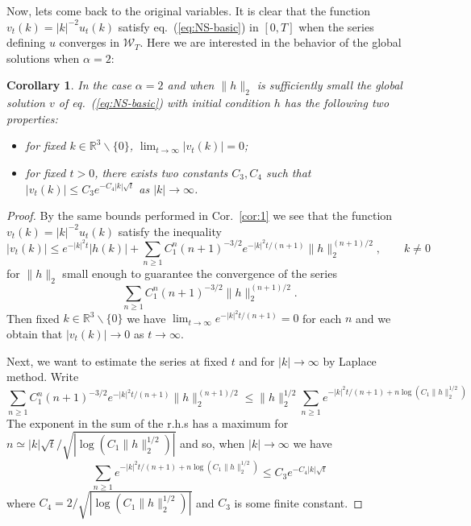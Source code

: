 \documentclass[a4paper,12pt,reqno]{amsart}
\newcommand{\1}{{\bf 1}}
\newcommand{\RR}{\mathbb{R}}
\newtheorem{corollary}[theorem]{Corollary}
\newcommand{\WW}{\mathcal{W}}
\begin{document}
Now, lets come back to the original variables. It is clear that the function $v_t(k) = |k|^{-2} u_t(k)$ satisfy eq.~(\ref{eq:NS-basic}) in $[0,T]$ when the series defining $u$ converges in $\WW_T$.  Here we are interested in the behavior of the global solutions when $\alpha =2$:

\begin{corollary}
In the case $\alpha = 2$ and when $\|h\|_2$ is sufficiently small the
global solution $v$ of  eq.~(\ref{eq:NS-basic}) with initial condition
$h$ has the following two properties:
\begin{itemize}
\item[a)]  for fixed $k \in \RR^3\backslash \{0\}$, $
\lim_{t \to \infty } |v_t(k)| = 0  $;
\item[b)] for fixed $t > 0$, there exists two constants $C_3,C_4$ such that
 $|v_t(k)| \le C_3 e^{-C_4 |k|\sqrt{t}}$ as $|k| \to \infty$.
\end{itemize}
\end{corollary}

\begin{proof}
By the same bounds performed in Cor.~\ref{cor:1} we see that the function $v_t(k) = |k|^{-2} u_t(k)$ satisfy the inequality 
\begin{equation*}
|v_t(k)| \le  e^{-|k|^2 t} |h(k)| + \sum_{n \ge 1} C_1^n 
(n+1)^{-3/2} e^{-|k|^2 t/(n+1)} \|h\|_2^{(n+1)/2}   , \qquad k \neq 0
\end{equation*}
for $\|h\|_2$ small enough to guarantee the convergence of the series
$$
\sum_{n \ge 1} C_1^n 
(n+1)^{-3/2} \|h\|_2^{(n+1)/2}.
$$
Then fixed $k \in \RR^3\backslash\{0\}$ we have   $\lim_{t \to \infty} e^{-|k|^2 t/(n+1)} = 0$ for each $n$ and we obtain that $|v_t(k)| \to 0$ as $t \to \infty$.

Next, we want to estimate the series at fixed $t$ and for $|k| \to \infty$ by Laplace method.
Write
$$
\sum_{n \ge 1} C_1^n 
(n+1)^{-3/2} e^{-|k|^2 t/(n+1)} \|h\|_2^{(n+1)/2} \le \|h\|_2^{1/2}
\sum_{n \ge 1}  e^{-|k|^2 t/(n+1) + n \log(C_1 \|h\|_2^{1/2})}  
$$
The exponent in the sum of the r.h.s has a maximum for $n \simeq |k|\sqrt{t}/\sqrt{|\log(C_1 \|h\|_2^{1/2})|}$ and so, when $|k| \to \infty$ we have
$$
\sum_{n \ge 1}  e^{-|k|^2 t/(n+1) + n \log(C_1 \|h\|_2^{1/2})}  \le C_3 e^{-C_4 |k|\sqrt{t}}
$$
where $C_4 = 2/\sqrt{|\log(C_1 \|h\|_2^{1/2})|}$ and $C_3$ is some finite constant.
\end{proof}
\end{document}
